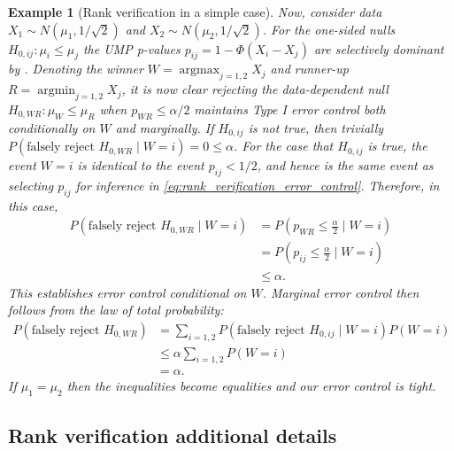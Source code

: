 \documentclass{article}
\DeclareMathOperator*{\argmin}{argmin}
\DeclareMathOperator*{\argmax}{argmax}
\newtheorem{example}{Example}
\begin{document}
\begin{appendix}
\begin{example}[Rank verification in a simple case]
    Now, consider data $X_1 \sim N(\mu_1, 1/\sqrt{2})$ and $X_2 \sim N(\mu_2, 1/\sqrt{2})$. For the one-sided nulls $H_{0, ij}: \mu_i \leq \mu_j$ the UMP p-values $p_{ij} = 1 - \Phi(X_i - X_j)$ are selectively dominant by . Denoting the winner $W = \argmax_{j = 1, 2} X_j$ and runner-up $R = \argmin_{j = 1, 2} X_j$, it is now clear rejecting the data-dependent null $H_{0, WR}: \mu_W \leq \mu_R$ when $p_{WR} \leq \alpha/2$ maintains Type I error control both conditionally on $W$ and marginally. If $H_{0, ij}$ is not true, then trivially $P(\text{falsely reject } H_{0, WR} \mid W = i) = 0 \leq \alpha$. For the case that $H_{0, ij}$ is true, the event $W=i$ is identical to the event $p_{ij} < 1/2$, and hence is the same event as selecting $p_{ij}$ for inference in \eqref{eq:rank_verification_error_control}. Therefore, in this case,
    \begin{align*}
        P(\text{falsely reject } H_{0, WR} \mid W = i) &= P\left(p_{WR} \leq \frac{\alpha}{2}  \mid W = i\right)\\
        &= P\left(p_{ij} \leq \frac{\alpha}{2}  \mid W = i \right) \\
        &\leq \alpha.
    \end{align*}
    This establishes error control conditional on $W$. Marginal error control then follows from the law of total probability:
    \begin{align*}
        P(\text{falsely reject } H_{0, WR}) &= \sum_{i=1, 2} P(\text{falsely reject } H_{0,ij} \mid W = i)P(W=i) \\
                                          &\leq \alpha \sum_{i = 1, 2} P(W=i)\\
                                          &=\alpha. 
    \end{align*}
    If $\mu_1 = \mu_2$ then the inequalities become equalities and our error control is tight. 
    \end{example}

\subsection{Rank verification additional details}
\label{sec:rank_verification_appdx}


\end{appendix}
\end{document}
